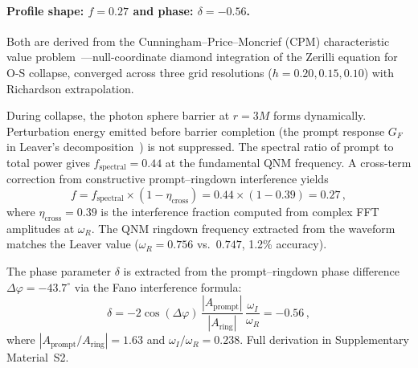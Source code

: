 \documentclass[aps,prd,twocolumn,superscriptaddress,showpacs,preprintnumbers,amsmath,amssymb,nofootinbib]{revtex4-2}
\begin{document}
\paragraph{Profile shape: $f = 0.27$ and phase: $\delta = -0.56$.}
Both are derived from the Cunningham--Price--Moncrief (CPM) characteristic value problem~\cite{CPM1978,CPM1979}---null-coordinate diamond integration of the Zerilli equation for O-S collapse, converged across three grid resolutions ($h = 0.20, 0.15, 0.10$) with Richardson extrapolation.

During collapse, the photon sphere barrier at $r = 3M$ forms dynamically. Perturbation energy emitted before barrier completion (the prompt response $G_F$ in Leaver's decomposition~\cite{Leaver1986}) is not suppressed. The spectral ratio of prompt to total power gives $f_\mathrm{spectral} = 0.44$ at the fundamental QNM frequency. A cross-term correction from constructive prompt--ringdown interference yields
\begin{equation}
\label{eq:f_derivation}
f = f_\mathrm{spectral} \times (1 - \eta_\mathrm{cross}) = 0.44 \times (1 - 0.39) = 0.27\,,
\end{equation}
where $\eta_\mathrm{cross} = 0.39$ is the interference fraction computed from complex FFT amplitudes at $\omega_R$. The QNM ringdown frequency extracted from the waveform matches the Leaver value ($\omega_R = 0.756$ vs.\ $0.747$, 1.2\% accuracy).

The phase parameter $\delta$ is extracted from the prompt--ringdown phase difference $\Delta\varphi = -43.7^{\circ}$ via the Fano interference formula:
\begin{equation}
\label{eq:delta_derivation}
\delta = -2\cos(\Delta\varphi)\,\frac{|A_\mathrm{prompt}|}{|A_\mathrm{ring}|}\,\frac{\omega_I}{\omega_R} = -0.56\,,
\end{equation}
where $|A_\mathrm{prompt}/A_\mathrm{ring}| = 1.63$ and $\omega_I/\omega_R = 0.238$. Full derivation in Supplementary Material~S2.
\end{document}
